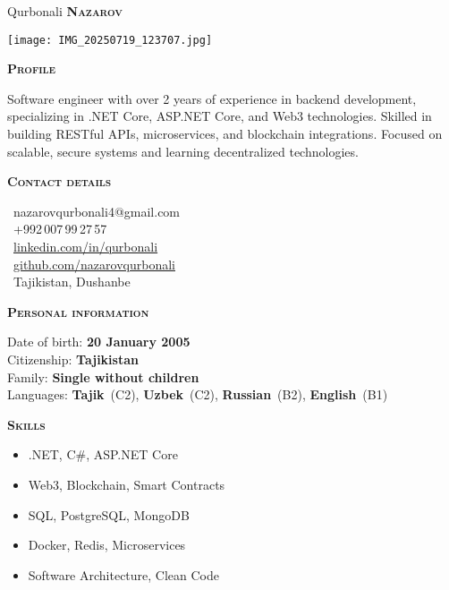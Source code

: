 \documentclass[11pt, a4paper]{article}
\newcommand{\headleft}[1]{\vspace*{3ex}\textsc{\textbf{#1}}\par%
    \vspace*{-1.5ex}\hrulefill\par\vspace*{0.7ex}}
\begin{document}
\setlength{\topskip}{0pt}
\setlength{\parindent}{0pt}
\setlength{\parskip}{0pt}
\setlength{\fboxsep}{0pt}
\pagestyle{empty}
\raggedbottom

\begin{minipage}[t]{0.33\textwidth}
\colorbox{cvblue}{\begin{minipage}[t][5mm][t]{\textwidth}\null\hfill\null\end{minipage}}

\vspace{-.2ex}
\colorbox{cvblue!90}{\color{white}
\textwidth\relax
\begin{minipage}[t][293mm][t]{0.82\textwidth}
\raggedright
\vspace*{2.5ex}

\Large Qurbonali \textbf{\textsc{Nazarov}} \normalsize

\null\hfill\texttt{[image: IMG\_20250719\_123707.jpg]}\hfill\null

\vspace*{0.5ex}

\headleft{Profile}
Software engineer with over 2 years of experience in backend development, specializing in .NET Core, ASP.NET Core, and Web3 technologies. Skilled in building RESTful APIs, microservices, and blockchain integrations. Focused on scalable, secure systems and learning decentralized technologies.

\headleft{Contact details}
\small
\MVAt\ {\small nazarovqurbonali4@gmail.com} \\[0.4ex]
\Mobilefone\ +992\,007\,99\,27\,57 \\[0.5ex]
\Mundus\ \href{https://linkedin.com/in/qurbonali-nazarov-8837b2310}{linkedin.com/in/qurbonali} \\[0.1ex]
\Mundus\ \href{https://github.com/nazarovqurbonali}{github.com/nazarovqurbonali} \\[0.1ex]
\Letter\ Tajikistan, Dushanbe
\normalsize

\headleft{Personal information}
Date of birth: \textbf{20 January 2005} \\[0.5ex]
Citizenship: \textbf{Tajikistan} \\[0.5ex]
Family: \textbf{Single without children} \\[0.5ex]
Languages: \textbf{Tajik}~(C2), \textbf{Uzbek}~(C2), \textbf{Russian}~(B2), \textbf{English}~(B1)

\headleft{Skills}
\begin{itemize}
\item .NET, C\#, ASP.NET Core
\item Web3, Blockchain, Smart Contracts
\item SQL, PostgreSQL, MongoDB
\item Docker, Redis, Microservices
\item Software Architecture, Clean Code
\end{itemize}

\end{minipage}
\textwidth\relax
}
\end{minipage}
\end{document}
